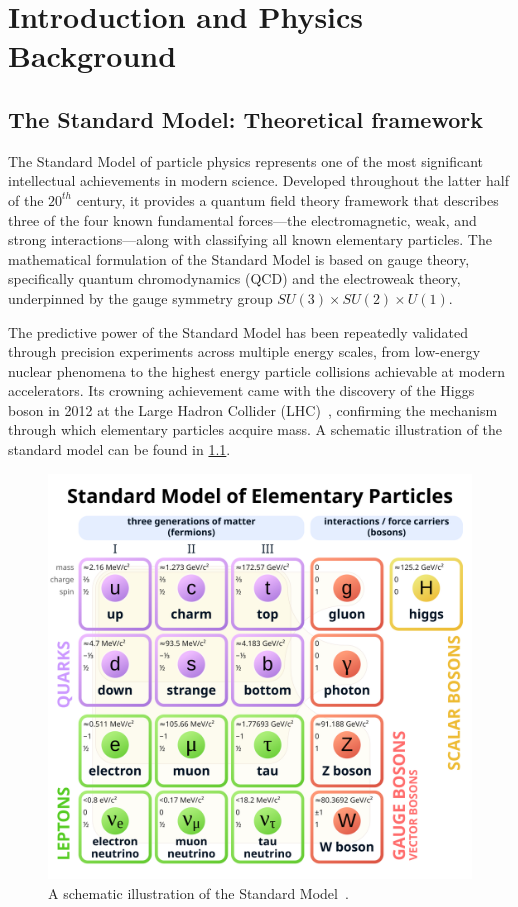 \chapter{Introduction and Physics Background}
\section{The Standard Model: Theoretical framework}
The Standard Model of particle physics represents one of the most significant intellectual achievements in modern science.
%
Developed throughout the latter half of the $20^{th}$ century, it provides a quantum field theory framework that describes three of the four known fundamental forces—the electromagnetic, weak, and strong interactions---along with classifying all known elementary particles.
%
The mathematical formulation of the Standard Model is based on gauge theory, specifically quantum chromodynamics (QCD) and the electroweak theory, underpinned by the gauge symmetry group \(SU(3)\times SU(2)\times U(1)\).

The predictive power of the Standard Model has been repeatedly validated through precision experiments across multiple energy scales, from low-energy nuclear phenomena to the highest energy particle collisions achievable at modern accelerators.
%
Its crowning achievement came with the discovery of the Higgs boson in 2012 at the Large Hadron Collider (LHC)~\cite{ATLAS:2012yve, collaboration_observation_2012}, confirming the mechanism through which elementary particles acquire mass.
%
A schematic illustration of the standard model can be found in \cref{fig:sm}.

\begin{figure}
    \centering
    \includegraphics[width=0.5\linewidth]{figures/chapter-01/Standard_Model_of_Elementary_Particles.svg.png}
    \caption{
        A schematic illustration of the Standard Model~\cite{wiki:stdmodel}.
    }
    \label{fig:sm}
\end{figure}

